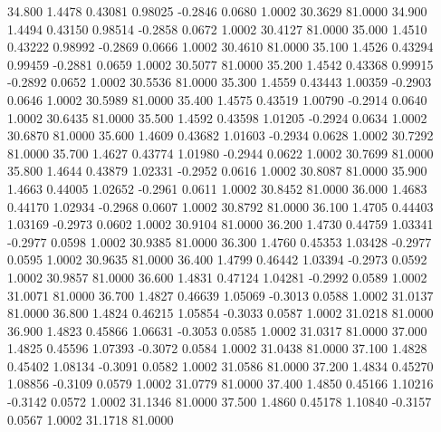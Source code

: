   34.800   1.4478   0.43081   0.98025  -0.2846   0.0680   1.0002  30.3629  81.0000
  34.900   1.4494   0.43150   0.98514  -0.2858   0.0672   1.0002  30.4127  81.0000
  35.000   1.4510   0.43222   0.98992  -0.2869   0.0666   1.0002  30.4610  81.0000
  35.100   1.4526   0.43294   0.99459  -0.2881   0.0659   1.0002  30.5077  81.0000
  35.200   1.4542   0.43368   0.99915  -0.2892   0.0652   1.0002  30.5536  81.0000
  35.300   1.4559   0.43443   1.00359  -0.2903   0.0646   1.0002  30.5989  81.0000
  35.400   1.4575   0.43519   1.00790  -0.2914   0.0640   1.0002  30.6435  81.0000
  35.500   1.4592   0.43598   1.01205  -0.2924   0.0634   1.0002  30.6870  81.0000
  35.600   1.4609   0.43682   1.01603  -0.2934   0.0628   1.0002  30.7292  81.0000
  35.700   1.4627   0.43774   1.01980  -0.2944   0.0622   1.0002  30.7699  81.0000
  35.800   1.4644   0.43879   1.02331  -0.2952   0.0616   1.0002  30.8087  81.0000
  35.900   1.4663   0.44005   1.02652  -0.2961   0.0611   1.0002  30.8452  81.0000
  36.000   1.4683   0.44170   1.02934  -0.2968   0.0607   1.0002  30.8792  81.0000
  36.100   1.4705   0.44403   1.03169  -0.2973   0.0602   1.0002  30.9104  81.0000
  36.200   1.4730   0.44759   1.03341  -0.2977   0.0598   1.0002  30.9385  81.0000
  36.300   1.4760   0.45353   1.03428  -0.2977   0.0595   1.0002  30.9635  81.0000
  36.400   1.4799   0.46442   1.03394  -0.2973   0.0592   1.0002  30.9857  81.0000
  36.600   1.4831   0.47124   1.04281  -0.2992   0.0589   1.0002  31.0071  81.0000
  36.700   1.4827   0.46639   1.05069  -0.3013   0.0588   1.0002  31.0137  81.0000
  36.800   1.4824   0.46215   1.05854  -0.3033   0.0587   1.0002  31.0218  81.0000
  36.900   1.4823   0.45866   1.06631  -0.3053   0.0585   1.0002  31.0317  81.0000
  37.000   1.4825   0.45596   1.07393  -0.3072   0.0584   1.0002  31.0438  81.0000
  37.100   1.4828   0.45402   1.08134  -0.3091   0.0582   1.0002  31.0586  81.0000
  37.200   1.4834   0.45270   1.08856  -0.3109   0.0579   1.0002  31.0779  81.0000
  37.400   1.4850   0.45166   1.10216  -0.3142   0.0572   1.0002  31.1346  81.0000
  37.500   1.4860   0.45178   1.10840  -0.3157   0.0567   1.0002  31.1718  81.0000
